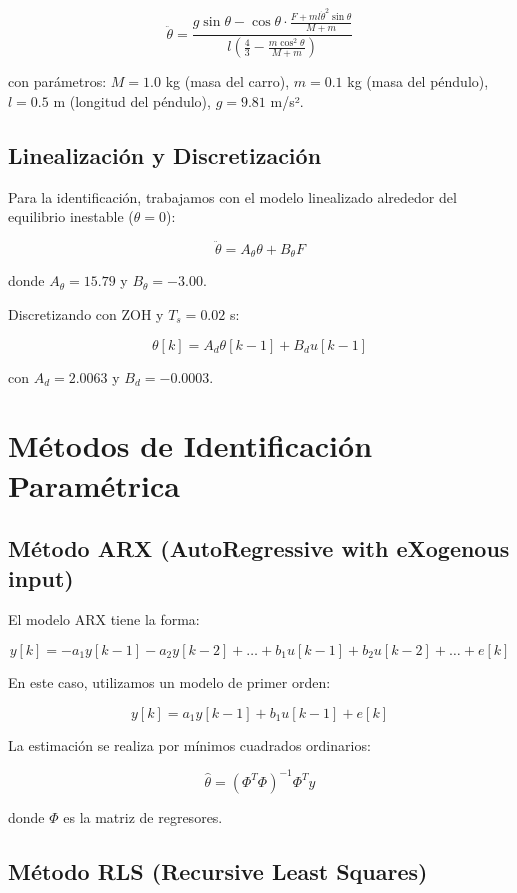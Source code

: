 \documentclass[a4paper,openright,9pt]{report}
\begin{document}
\[
\ddot{\theta} = \frac{g \sin\theta - \cos\theta \cdot \frac{F + m l \dot{\theta}^2 \sin\theta}{M + m}}{l \left(\frac{4}{3} - \frac{m \cos^2\theta}{M + m}\right)}
\]

con parámetros: $M = 1.0$ kg (masa del carro), $m = 0.1$ kg (masa del péndulo), $l = 0.5$ m (longitud del péndulo), $g = 9.81$ m/s².

\subsection{Linealización y Discretización}

Para la identificación, trabajamos con el modelo linealizado alrededor del equilibrio inestable ($\theta = 0$):

\[
\ddot{\theta} = A_\theta \theta + B_\theta F
\]

donde $A_\theta = 15.79$ y $B_\theta = -3.00$.

Discretizando con ZOH y $T_s = 0.02$ s:

\[
\theta[k] = A_d \theta[k-1] + B_d u[k-1]
\]

con $A_d = 2.0063$ y $B_d = -0.0003$.

\section{Métodos de Identificación Paramétrica}

\subsection{Método ARX (AutoRegressive with eXogenous input)}

El modelo ARX tiene la forma:

\[
y[k] = -a_1 y[k-1] - a_2 y[k-2] + \dots + b_1 u[k-1] + b_2 u[k-2] + \dots + e[k]
\]

En este caso, utilizamos un modelo de primer orden:

\[
y[k] = a_1 y[k-1] + b_1 u[k-1] + e[k]
\]

La estimación se realiza por mínimos cuadrados ordinarios:

\[
\hat{\theta} = (\Phi^T \Phi)^{-1} \Phi^T y
\]

donde $\Phi$ es la matriz de regresores.

\subsection{Método RLS (Recursive Least Squares)}
\end{document}
